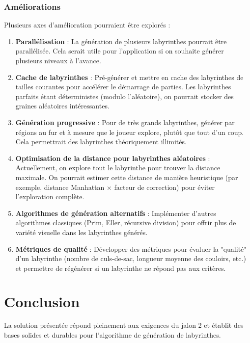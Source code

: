 \documentclass{butexFR}
\begin{document}
\subsubsection{Améliorations}

Plusieurs axes d'amélioration pourraient être explorés :

\begin{enumerate}
    \item \textbf{Parallélisation} : La génération de plusieurs labyrinthes pourrait être parallélisée. Cela serait utile pour l'application si on souhaite générer plusieurs niveaux à l'avance.

    \item \textbf{Cache de labyrinthes} : Pré-générer et mettre en cache des labyrinthes de tailles courantes pour accélérer le démarrage de parties. Les labyrinthes parfaits étant déterministes (modulo l'aléatoire), on pourrait stocker des graines aléatoires intéressantes.

    \item \textbf{Génération progressive} : Pour de très grands labyrinthes, générer par régions au fur et à mesure que le joueur explore, plutôt que tout d'un coup. Cela permettrait des labyrinthes théoriquement illimités.

    \item \textbf{Optimisation de la distance pour labyrinthes aléatoires} : Actuellement, on explore tout le labyrinthe pour trouver la distance maximale. On pourrait estimer cette distance de manière heuristique (par exemple, distance Manhattan $\times$ facteur de correction) pour éviter l'exploration complète.

    \item \textbf{Algorithmes de génération alternatifs} : Implémenter d'autres algorithmes classiques (Prim, Eller, récursive division) pour offrir plus de variété visuelle dans les labyrinthes générés.

    \item \textbf{Métriques de qualité} : Développer des métriques pour évaluer la "qualité" d'un labyrinthe (nombre de culs-de-sac, longueur moyenne des couloirs, etc.) et permettre de régénérer si un labyrinthe ne répond pas aux critères.
\end{enumerate}

\section{Conclusion}

La solution présentée répond pleinement aux exigences du jalon 2 et établit des bases solides et durables pour l’algorithme de génération de labyrinthes.
\end{document}
